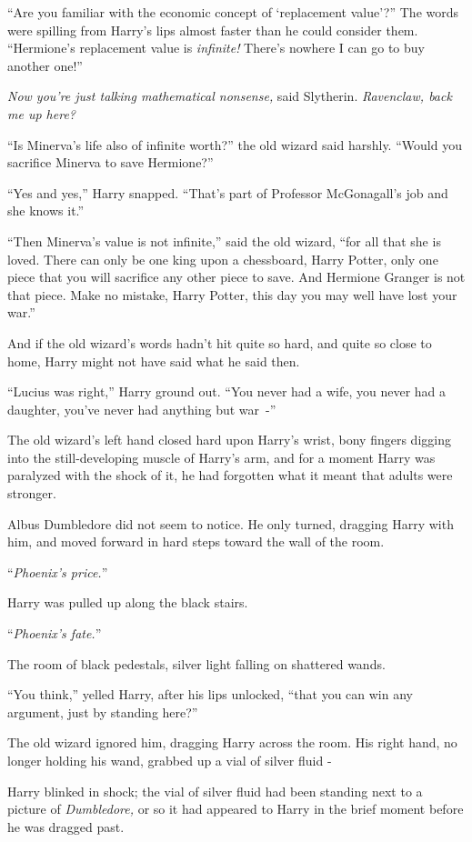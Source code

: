 ``Are you familiar with the economic concept of `replacement value'?'' The words were spilling from Harry's lips almost faster than he could consider them. ``Hermione's replacement value is \emph{infinite!} There's nowhere I can go to buy another one!''

\emph{Now you're just talking mathematical nonsense,} said Slytherin. \emph{Ravenclaw, back me up here?}

``Is Minerva's life also of infinite worth?'' the old wizard said harshly. ``Would you sacrifice Minerva to save Hermione?''

``Yes and yes,'' Harry snapped. ``That's part of Professor McGonagall's job and she knows it.''

``Then Minerva's value is not infinite,'' said the old wizard, ``for all that she is loved. There can only be one king upon a chessboard, Harry Potter, only one piece that you will sacrifice any other piece to save. And Hermione Granger is not that piece. Make no mistake, Harry Potter, this day you may well have lost your war.''

And if the old wizard's words hadn't hit quite so hard, and quite so close to home, Harry might not have said what he said then.

``Lucius was right,'' Harry ground out. ``You never had a wife, you never had a daughter, you've never had anything but war~-''

The old wizard's left hand closed hard upon Harry's wrist, bony fingers digging into the still-developing muscle of Harry's arm, and for a moment Harry was paralyzed with the shock of it, he had forgotten what it meant that adults were stronger.

Albus Dumbledore did not seem to notice. He only turned, dragging Harry with him, and moved forward in hard steps toward the wall of the room.

``\emph{Phoenix's price.}''

Harry was pulled up along the black stairs.

``\emph{Phoenix's fate.}''

The room of black pedestals, silver light falling on shattered wands.

``You think,'' yelled Harry, after his lips unlocked, ``that you can win any argument, just by standing here?''

The old wizard ignored him, dragging Harry across the room. His right hand, no longer holding his wand, grabbed up a vial of silver fluid -

Harry blinked in shock; the vial of silver fluid had been standing next to a picture of \emph{Dumbledore,} or so it had appeared to Harry in the brief moment before he was dragged past.

